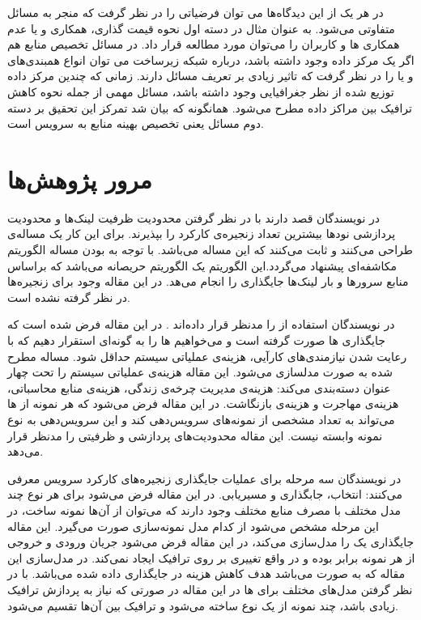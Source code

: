 در هر یک از این دیدگاه‌ها می توان فرضیاتی را در نظر گرفت که منجر به مسائل متفاوتی می‌شود.
به عنوان مثال در دسته اول نحوه قیمت گذاری، همکاری و یا عدم همکاری ‌ها و کاربران را می‌توان مورد مطالعه قرار داد.
در مسائل تخصیص منابع هم اگر یک مرکز داده وجود داشته باشد،
درباره شبکه زیرساخت می توان انواع همبندی‌های  و یا  را در نظر گرفت
که تاثیر زیادی بر تعریف مسائل دارند.
زمانی که چندین مرکز داده توزیع شده از نظر جغرافیایی وجود داشته باشد،
مسائل مهمی از جمله نحوه کاهش ترافیک بین مراکز داده مطرح می‌شود.
همانگونه که بیان شد تمرکز این تحقیق بر دسته دوم مسائل یعنی تخصیص بهینه منابع به سرویس است.

\section{مرور پژوهش‌ها}

در \cite{Eramo2016}
نویسندگان قصد دارند با در نظر گرفتن محدودیت ظرفیت لینک‌ها و محدودیت پردازشی نودها
بیشترین تعداد زنجیره‌ی کارکرد را بپذیرند. برای این کار یک مساله‌ی 
طراحی می‌کنند و ثابت می‌کنند که این مساله  می‌باشد.
با توجه به 
بودن مساله الگوریتم مکاشفه‌ای 
پیشنهاد می‌گردد.این الگوریتم یک الگوریتم حریصانه می‌باشد که براساس
منابع سرورها و بار لینک‌ها جایگذاری را انجام می‌هد.
در این مقاله وجود  برای زنجیره‌ها در نظر گرفته نشده است.

در \cite{AbuLebdeh2017}
نویسندگان استفاده از  را مدنظر قرار داده‌اند
. در این مقاله فرض شده است که جایگذاری ها صورت گرفته است
و می‌خواهیم ها را به گونه‌ای استقرار دهیم
که با رعایت شدن نیازمندی‌های کارآیی، هزینه‌ی عملیاتی سیستم حداقل شود.
مساله مطرح شده به صورت  مدلسازی می‌شود.
این مقاله هزینه‌ی عملیاتی سیستم را تحت چهار عنوان دسته‌بندی می‌کند:
هزینه‌ی مدیریت چرخه‌ی زندگی، هزینه‌ی منابع محاسباتی، هزینه‌ی مهاجرت و هزینه‌ی بازنگاشت.
در این مقاله فرض می‌شود که هر نمونه از ها می‌تواند به تعداد مشخصی از نمونه‌های 
سرویس‌دهی کند و این سرویس‌دهی به نوع نمونه وابسته نیست.
این مقاله محدودیت‌های پردازشی و ظرفیتی را مدنظر قرار می‌دهد.

در \cite{Ghaznavi2017}
نویسندگان سه مرحله برای عملیات جایگذاری زنجیره‌های کارکرد سرویس معرفی می‌کنند:
انتخاب،
جابگذاری و
مسیریابی.
در این مقاله فرض می‌شود برای هر نوع 
چند مدل مختلف با مصرف منابع مختلف وجود دارند که می‌توان از آن‌ها نمونه ساخت، در این مرحله مشخص می‌شود
از کدام مدل نمونه‌سازی صورت می‌گیرد.
این مقاله جایگذاری یک  را مدل‌سازی می‌کند،
در این مقاله فرض می‌شود جریان ورودی و خروجی از هر نمونه برابر بوده و در واقع
 تغییری بر روی ترافیک ایجاد نمی‌کند.
در مدل‌سازی این مقاله که به صورت  می‌باشد هدف کاهش هزینه در جایگذاری  داده شده می‌باشد.
با در نظر گرفتن مدل‌های مختلف برای ها در این مقاله
در صورتی که نیاز به پردازش ترافیک زیادی باشد، چند نمونه از یک نوع 
ساخته می‌شود و ترافیک بین آن‌ها تقسیم می‌شود.

